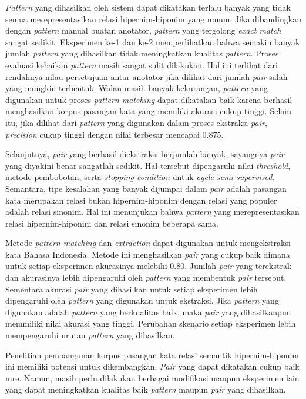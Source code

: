 \textit{Pattern} yang dihasilkan oleh sistem dapat dikatakan terlalu banyak yang tidak semua merepresentasikan relasi hipernim-hiponim yang umum. Jika dibandingkan dengan \textit{pattern} manual buatan anotator, \textit{pattern} yang tergolong \textit{exact match} sangat sedikit. Eksperimen ke-1 dan ke-2 memperlihatkan bahwa semakin banyak jumlah \textit{pattern} yang dihasilkan tidak meningkatkan kualitas \textit{pattern}. Proses evaluasi kebaikan \textit{pattern} masih sangat sulit dilakukan. Hal ini terlihat dari rendahnya nilau persetujuan antar anotator jika dilihat dari jumlah \textit{pair} salah yang mungkin terbentuk. Walau masih banyak kekurangan, \textit{pattern} yang digunakan untuk proses \textit{pattern matching} dapat dikatakan baik karena berhasil menghasilkan korpus pasangan kata yang memiliki akurasi cukup tinggi. Selain itu, jika dilihat dari \textit{pattern} yang digunakan dalam proses ekstraksi \textit{pair}, \textit{precision} cukup tinggi dengan nilai terbesar mencapai 0.875.

Selanjutnya, \textit{pair} yang berhasil diekstraksi berjumlah banyak, sayangnya \textit{pair} yang diyakini benar sangatlah sedikit. Hal tersebut dipengaruhi nilai \textit{threshold}, metode pembobotan, serta \textit{stopping condition} untuk \textit{cycle semi-supervised}. Semantara, tipe kesalahan yang banyak dijumpai dalam \textit{pair} adalah pasangan kata merupakan relasi bukan hipernim-hiponim dengan relasi yang populer adalah relasi sinonim. Hal ini menunjukan bahwa \textit{pattern} yang merepresentasikan relasi hipernim-hiponim dan relasi sinonim beberapa sama. 

Metode \textit{pattern matching} dan \textit{extraction} dapat digunakan untuk mengekstraksi kata Bahasa Indonesia. Metode ini menghasilkan \textit{pair} yang cukup baik dimana untuk setiap eksperimen akurasinya melebihi 0.80. Jumlah \textit{pair} yang terekstrak dan akurasinya lebih dipengaruhi oleh \textit{pattern} yang membentuk \textit{pair} tersebut. Sementara akurasi \textit{pair} yang dihasilkan untuk setiap eksperimen lebih dipengaruhi oleh \textit{pattern} yang digunakan untuk ekstraksi. Jika \textit{pattern} yang digunakan adalah \textit{pattern} yang berkualitas baik, maka \textit{pair} yang dihasilkanpun memmiliki nilai akurasi yang tinggi. Perubahan skenario setiap eksperimen lebih mempengaruhi urutan \textit{pattern} yang dihasilkan.

Penelitian pembangunan korpus pasangan kata relasi semantik hipernim-hiponim ini memiliki potensi untuk dikembangkan. \textit{Pair} yang dapat dikatakan cukup baik mre. Namun, masih perlu dilakukan berbagai modifikasi maupun eksperimen lain yang dapat meningkatkan kualitas baik \textit{pattern} maupun \textit{pair} yang dihasilkan.

